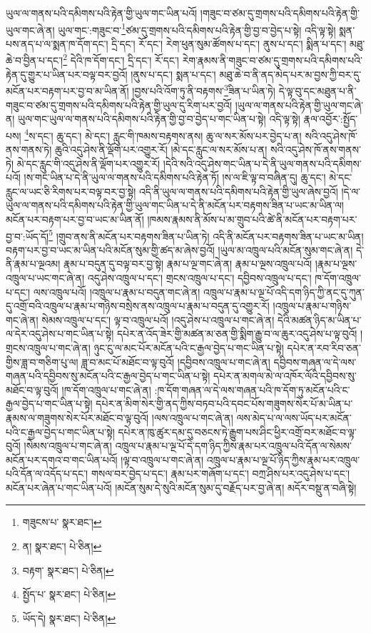 ཡུལ་ལ་གནས་པའི་དམིགས་པའི་རྟེན་གྱི་ཡུལ་གང་ཡིན་པའོ། །གཟུང་བ་ཙམ་དུ་གྲགས་པའི་དམིགས་པའི་རྟེན་གྱི་ཡུལ་གང་ཞེ་ན། ཡུལ་གང་:གཟུང་བ་\footnote{གཟུངས་པ་  སྣར་ཐང་། }ཙམ་དུ་གྲགས་པའི་དམིགས་པའི་རྟེན་གྱི་བྱ་བ་བྱེད་པ་སྟེ། འདི་ལྟ་སྟེ། སྨན་པས་ནད་པ་ལ་སྨན་ཁ་དོག་དང་། དྲི་དང་། རོ་དང་། རེག་ཕུན་སུམ་ཚོགས་པ་དང་། ནུས་པ་དང་། སྨིན་པ་དང་། མཐུ་ཆེ་བ་བྱིན་པ་དང་།\footnote{ན།  སྣར་ཐང་།  པེ་ཅིན། } དེའི་ཁ་དོག་དང་། དྲི་དང་། རོ་དང་། རེག་རྣམས་ནི་གཟུང་བ་ཙམ་དུ་གྲགས་པའི་དམིགས་པའི་རྟེན་དུ་གྱུར་པ་ཡིན་པར་བལྟ་བར་བྱའོ། །ནུས་པ་དང་། སྨན་པ་དང་། མཐུ་ཆེ་བ་ནི་ནད་མེད་པར་མ་བྱས་ཀྱི་བར་དུ་མངོན་པར་བརྟག་པར་བྱ་བ་མ་ཡིན་ནོ། །བྱས་པའི་འོག་ཏུ་ནི་བརྟགས་\footnote{བརྟག་  སྣར་ཐང་།  པེ་ཅིན། }ཟིན་པ་ཡིན་ཏེ། དེ་ལྟ་བུ་དང་མཐུན་པ་ནི་གཟུང་བ་ཙམ་དུ་གྲགས་པའི་དམིགས་པའི་རྟེན་གྱི་ཡུལ་དུ་རིག་པར་བྱའོ། །ཡུལ་ལ་གནས་པའི་རྟེན་གྱི་ཡུལ་གང་ཞེ་ན། ཡུལ་གང་ཡུལ་ལ་གནས་པའི་དམིགས་པའི་རྟེན་གྱི་བྱ་བ་བྱེད་པ་གང་ཡིན་པ་སྟེ། འདི་ལྟ་སྟེ། རྣལ་འབྱོར་:སྤྱོད་པས། \footnote{སྤྱོད་པ་  སྣར་ཐང་།  པེ་ཅིན། }ས་དང་། ཆུ་དང་། མེ་དང་། རླུང་གི་ཁམས་བརྟགས་ནས། ཆུ་ལ་སར་མོས་པར་བྱེད་པ་ན། སའི་འདུ་ཤེས་ཁོ་ནས་གནས་ཏེ། ཆུའི་འདུ་ཤེས་ནི་ལྡོག་པར་འགྱུར་རོ། །མེ་དང་རླུང་ལ་སར་མོས་པ་ན། སའི་འདུ་ཤེས་ཁོ་ནས་གནས་ཏེ། མེ་དང་རླུང་གི་འདུ་ཤེས་ནི་ལྡོག་པར་འགྱུར་རོ། །དེའི་སའི་འདུ་ཤེས་གང་ཡིན་པ་དེ་ནི་ཡུལ་གནས་པའི་དམིགས་པའོ། །ས་གང་ཡིན་པ་དེ་ནི་ཡུལ་ལ་གནས་པའི་དམིགས་པའི་རྟེན་ཏོ། །ས་ལ་ཇི་ལྟ་བ་བཞིན་དུ། ཆུ་དང་། མེ་དང་རླུང་ལ་ཡང་ཅི་རིགས་པར་བལྟ་བར་བྱ་སྟེ། འདི་ནི་ཡུལ་ལ་གནས་པའི་དམིགས་པའི་རྟེན་གྱི་ཡུལ་ཞེས་བྱའོ། །དེ་ལ་ཡུལ་ལ་གནས་པའི་དམིགས་པའི་རྟེན་གྱི་ཡུལ་གང་ཡིན་པ་དེ་ནི་མངོན་པར་བརྟགས་ཟིན་པ་ཡང་མ་ཡིན་ལ། མངོན་པར་བརྟག་པར་བྱ་བ་ཡང་མ་ཡིན་ནོ། །ཁམས་རྣམས་ནི་མོས་པ་མ་གྲུབ་པའི་ཚེ་ནི་མངོན་པར་བརྟག་པར་བྱ་བ་:ཡོད་དོ།\footnote{ཡོད་དེ།  སྣར་ཐང་།  པེ་ཅིན། } །གྲུབ་ནས་ནི་མངོན་པར་བརྟགས་ཟིན་པ་ཡིན་ཏེ། འདི་ནི་མངོན་པར་བརྟགས་ཟིན་པ་ཡང་མ་ཡིན། བརྟག་པར་བྱ་བ་ཡང་མ་ཡིན་པའི་མངོན་སུམ་གྱི་ཚད་མ་ཞེས་བྱའོ། །ཡུལ་མ་འཁྲུལ་པའི་མངོན་སུམ་གང་ཞེ་ན། དེ་ནི་རྣམ་པ་ལྔའམ། རྣམ་པ་བདུན་དུ་བལྟ་བར་བྱ་སྟེ། རྣམ་པ་ལྔ་གང་ཞེ་ན། རྣམ་པ་ལྔས་འཁྲུལ་པའོ། །རྣམ་པ་ལྔས་འཁྲུལ་པ་ཡང་གང་ཞེ་ན། འདུ་ཤེས་འཁྲུལ་པ་དང་། གྲངས་འཁྲུལ་པ་དང་། དབྱིབས་འཁྲུལ་པ་དང་། ཁ་དོག་འཁྲུལ་པ་དང་། ལས་འཁྲུལ་པའོ། །འཁྲུལ་པ་རྣམ་པ་བདུན་གང་ཞེ་ན། འཁྲུལ་པ་རྣམ་པ་ལྔ་པོ་འདི་དག་ཉིད་ཀྱི་ནང་དུ་ཀུན་དུ་འགྲོ་བའི་འཁྲུལ་པ་རྣམ་པ་གཉིས་བསྲེས་ནས་འཁྲུལ་པ་རྣམ་པ་བདུན་དུ་འགྱུར་རོ། །འཁྲུལ་པ་རྣམ་པ་གཉིས་གང་ཞེ་ན། སེམས་འཁྲུལ་པ་དང་། ལྟ་བ་འཁྲུལ་པའོ། །འདུ་ཤེས་པ་འཁྲུལ་པ་གང་ཞེ་ན། དེའི་མཚན་ཉིད་མ་ཡིན་པ་ལ་དེར་འདུ་ཤེས་པ་གང་ཡིན་པ་སྟེ། དཔེར་ན་འོད་ཟེར་གྱི་མཚན་མ་ཅན་གྱི་སྨིག་རྒྱུ་བ་ལ་ཆུར་འདུ་ཤེས་པ་ལྟ་བུའོ། །གྲངས་འཁྲུལ་པ་གང་ཞེ་ན། ཉུང་ངུ་ལ་མང་པོར་མངོན་པའི་ང་རྒྱལ་བྱེད་པ་གང་ཡིན་པ་སྟེ། དཔེར་ན་རབ་རིབ་ཅན་གྱིས་ཟླ་བ་གཅིག་པུ་ལ། ཟླ་བ་མང་པོ་མཐོང་བ་ལྟ་བུའོ། །དབྱིབས་འཁྲུལ་པ་གང་ཞེ་ན། དབྱིབས་གཞན་ལ་དེ་ལས་གཞན་པའི་དབྱིབས་སུ་མངོན་པའི་ང་རྒྱལ་བྱེད་པ་གང་ཡིན་པ་སྟེ། དཔེར་ན་མགལ་མེ་ལ་འཁོར་ལོའི་དབྱིབས་སུ་མཐོང་བ་ལྟ་བུའོ། །ཁ་དོག་འཁྲུལ་པ་གང་ཞེ་ན། :ཁ་དོག་གཞན་ལ་དེ་ལས་གཞན་པའི་ཁ་དོག་ཏུ་མངོན་པའི་ང་རྒྱལ་བྱེད་པ་གང་ཡིན་པ་སྟེ། དཔེར་ན་མིག་སེར་གྱི་ནད་ཀྱིས་བཏབ་པའི་དབང་པོས་གཟུགས་སེར་པོ་མ་ཡིན་པ་རྣམས་ལ་གཟུགས་སེར་པོར་མཐོང་བ་ལྟ་བུའོ། །ལས་འཁྲུལ་པ་གང་ཞེ་ན། ལས་མེད་པ་ལ་ལས་ཡོད་པར་མངོན་པའི་ང་རྒྱལ་བྱེད་པ་གང་ཡིན་པ་སྟེ། དཔེར་ན་ཁུ་ཚུར་དམ་དུ་བཅངས་ཏེ་རྒྱུག་པས་ཤིང་ཕྱིར་འགྲོ་བར་མཐོང་བ་ལྟ་བུའོ། །སེམས་འཁྲུལ་པ་གང་ཞེ་ན། འཁྲུལ་པ་རྣམ་པ་ལྔ་པོ་དེ་དག་ཉིད་ཀྱིས་རྣམ་པར་འཁྲུལ་པའི་དོན་ལ་སེམས་མངོན་པར་དགའ་བ་གང་ཡིན་པའོ། །ལྟ་བ་འཁྲུལ་པ་གང་ཞེ་ན། འཁྲུལ་པ་རྣམ་པ་ལྔ་པོ་ཉིད་ཀྱིས་རྣམ་པར་འཁྲུལ་པའི་དོན་ལ་འདོད་པ་དང་། གསལ་བར་བྱེད་པ་དང་། རྣམ་པར་གཞོག་པ་དང་། བཀྲ་ཤིས་པར་འདུ་ཤེས་པ་དང་། མངོན་པར་ཞེན་པ་གང་ཡིན་པའོ། །མངོན་སུམ་དེ་སུའི་མངོན་སུམ་དུ་བརྗོད་པར་བྱ་ཞེ་ན། མདོར་བསྡུ་ན་བཞི་སྟེ། 